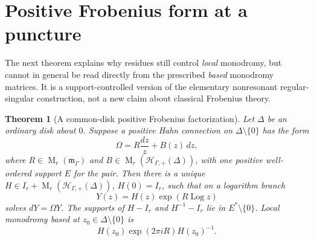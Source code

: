\documentclass[11pt,letterpaper]{article}
\numberwithin{equation}{section}
\newtheorem{theorem}{Theorem}[section]
\theoremstyle{definition}
\theoremstyle{remark}
\newcommand{\HH}{\mathcal H}
\newcommand{\mm}{\mathfrak m}
\newcommand{\Log}{\operatorname{Log}}
\newcommand{\Mat}{\operatorname{M}}
\newcommand{\Hp}{\HH_{\Gamma,+}}
\begin{document}
\section{Positive Frobenius form at a puncture}\label{sec:frobenius}

The next theorem explains why residues still control \emph{local} monodromy,
but cannot in general be read directly from the prescribed \emph{based}
monodromy matrices. It is a support-controlled version of the elementary
nonresonant regular-singular construction, not a new claim about classical
Frobenius theory.

\begin{theorem}[A common-disk positive Frobenius factorization]
\label{thm:frobenius}
Let $\Delta$ be an ordinary disk about $0$. Suppose a positive Hahn
connection on $\Delta\setminus\{0\}$ has the form
\begin{equation}\label{eq:local-connection}
 \Omega=R\frac{dz}{z}+B(z)\,dz,
\end{equation}
where $R\in\Mat_r(\mm_\Gamma)$ and
$B\in\Mat_r(\Hp(\Delta))$, with one positive well-ordered support $E$ for
the pair. Then there is a unique
$H\in I_r+\Mat_r(\Hp(\Delta))$, $H(0)=I_r$, such that on a logarithm branch
\begin{equation}\label{eq:frobenius}
 Y(z)=H(z)\exp(R\Log z)
\end{equation}
solves $dY=\Omega Y$. The supports of $H-I_r$ and $H^{-1}-I_r$ lie in
$E^*\setminus\{0\}$. Local monodromy based at $z_0\in\Delta\setminus\{0\}$
is
\begin{equation}\label{eq:local-monodromy}
 H(z_0)\exp(2\pi iR)H(z_0)^{-1}.
\end{equation}
\end{theorem}
\end{document}
